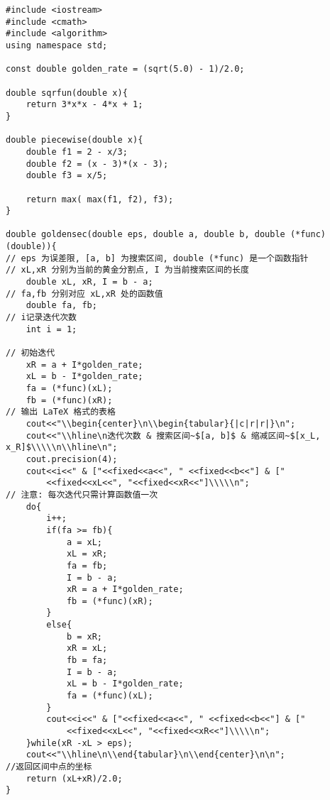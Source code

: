 \documentclass[a4paper,12pt]{article}
\begin{document}
\begin{CJK*}{UTF8}{gbsn}
\begin{lstlisting}[caption={黄金分割法}, label={goldensec}]
#include <iostream>
#include <cmath>
#include <algorithm>
using namespace std;

const double golden_rate = (sqrt(5.0) - 1)/2.0;

double sqrfun(double x){
    return 3*x*x - 4*x + 1;
}

double piecewise(double x){
    double f1 = 2 - x/3;
    double f2 = (x - 3)*(x - 3);
    double f3 = x/5;

    return max( max(f1, f2), f3);
}

double goldensec(double eps, double a, double b, double (*func)(double)){
// eps 为误差限, [a, b] 为搜索区间, double (*func) 是一个函数指针
// xL,xR 分别为当前的黄金分割点, I 为当前搜索区间的长度
    double xL, xR, I = b - a;
// fa,fb 分别对应 xL,xR 处的函数值
    double fa, fb;
// i记录迭代次数
    int i = 1;

// 初始迭代
    xR = a + I*golden_rate;
    xL = b - I*golden_rate;
    fa = (*func)(xL);
    fb = (*func)(xR);
// 输出 LaTeX 格式的表格
    cout<<"\\begin{center}\n\\begin{tabular}{|c|r|r|}\n";
    cout<<"\\hline\n迭代次数 & 搜索区间~$[a, b]$ & 缩减区间~$[x_L, x_R]$\\\\\n\\hline\n";
    cout.precision(4);
    cout<<i<<" & ["<<fixed<<a<<", " <<fixed<<b<<"] & ["
        <<fixed<<xL<<", "<<fixed<<xR<<"]\\\\\n";
// 注意: 每次迭代只需计算函数值一次
    do{
        i++;
        if(fa >= fb){
            a = xL;
            xL = xR;
            fa = fb;
            I = b - a;
            xR = a + I*golden_rate;
            fb = (*func)(xR);
        }
        else{
            b = xR;
            xR = xL;
            fb = fa;
            I = b - a;
            xL = b - I*golden_rate;
            fa = (*func)(xL);
        }
        cout<<i<<" & ["<<fixed<<a<<", " <<fixed<<b<<"] & ["
            <<fixed<<xL<<", "<<fixed<<xR<<"]\\\\\n";
    }while(xR -xL > eps);
    cout<<"\\hline\n\\end{tabular}\n\\end{center}\n\n";
//返回区间中点的坐标
    return (xL+xR)/2.0;
}


\end{lstlisting}
\end{CJK*}
\end{document}
